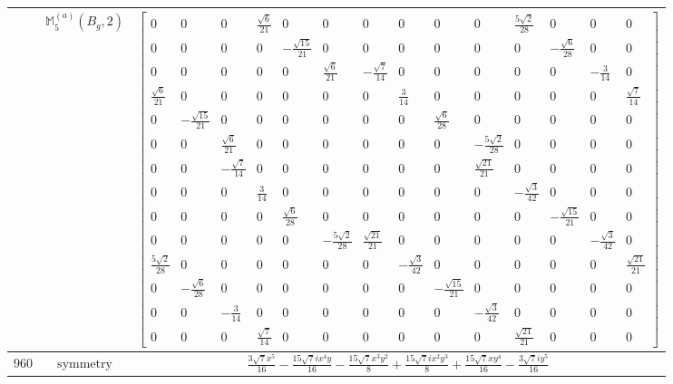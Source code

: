 \documentclass[fleqn,8pt,landscape]{jsarticle}
\begin{document}
\begin{longtable}{ccc}
$  $ & $ \mathbb{M}_{5}^{(a)}(B_{g},2) $ & $ \begin{bmatrix} 0 & 0 & 0 & \frac{\sqrt{6}}{21} & 0 & 0 & 0 & 0 & 0 & 0 & \frac{5 \sqrt{2}}{28} & 0 & 0 & 0 \\ 0 & 0 & 0 & 0 & - \frac{\sqrt{15}}{21} & 0 & 0 & 0 & 0 & 0 & 0 & - \frac{\sqrt{6}}{28} & 0 & 0 \\ 0 & 0 & 0 & 0 & 0 & \frac{\sqrt{6}}{21} & - \frac{\sqrt{7}}{14} & 0 & 0 & 0 & 0 & 0 & - \frac{3}{14} & 0 \\ \frac{\sqrt{6}}{21} & 0 & 0 & 0 & 0 & 0 & 0 & \frac{3}{14} & 0 & 0 & 0 & 0 & 0 & \frac{\sqrt{7}}{14} \\ 0 & - \frac{\sqrt{15}}{21} & 0 & 0 & 0 & 0 & 0 & 0 & \frac{\sqrt{6}}{28} & 0 & 0 & 0 & 0 & 0 \\ 0 & 0 & \frac{\sqrt{6}}{21} & 0 & 0 & 0 & 0 & 0 & 0 & - \frac{5 \sqrt{2}}{28} & 0 & 0 & 0 & 0 \\ 0 & 0 & - \frac{\sqrt{7}}{14} & 0 & 0 & 0 & 0 & 0 & 0 & \frac{\sqrt{21}}{21} & 0 & 0 & 0 & 0 \\ 0 & 0 & 0 & \frac{3}{14} & 0 & 0 & 0 & 0 & 0 & 0 & - \frac{\sqrt{3}}{42} & 0 & 0 & 0 \\ 0 & 0 & 0 & 0 & \frac{\sqrt{6}}{28} & 0 & 0 & 0 & 0 & 0 & 0 & - \frac{\sqrt{15}}{21} & 0 & 0 \\ 0 & 0 & 0 & 0 & 0 & - \frac{5 \sqrt{2}}{28} & \frac{\sqrt{21}}{21} & 0 & 0 & 0 & 0 & 0 & - \frac{\sqrt{3}}{42} & 0 \\ \frac{5 \sqrt{2}}{28} & 0 & 0 & 0 & 0 & 0 & 0 & - \frac{\sqrt{3}}{42} & 0 & 0 & 0 & 0 & 0 & \frac{\sqrt{21}}{21} \\ 0 & - \frac{\sqrt{6}}{28} & 0 & 0 & 0 & 0 & 0 & 0 & - \frac{\sqrt{15}}{21} & 0 & 0 & 0 & 0 & 0 \\ 0 & 0 & - \frac{3}{14} & 0 & 0 & 0 & 0 & 0 & 0 & - \frac{\sqrt{3}}{42} & 0 & 0 & 0 & 0 \\ 0 & 0 & 0 & \frac{\sqrt{7}}{14} & 0 & 0 & 0 & 0 & 0 & 0 & \frac{\sqrt{21}}{21} & 0 & 0 & 0 \end{bmatrix} $ \\ \hline
$ 960 $ & $ \text{symmetry} $ & $ \frac{3 \sqrt{7} x^{5}}{16} - \frac{15 \sqrt{7} i x^{4} y}{16} - \frac{15 \sqrt{7} x^{3} y^{2}}{8} + \frac{15 \sqrt{7} i x^{2} y^{3}}{8} + \frac{15 \sqrt{7} x y^{4}}{16} - \frac{3 \sqrt{7} i y^{5}}{16} $ \\

\end{longtable}
\end{document}
